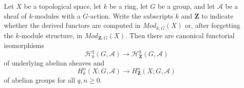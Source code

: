\begin{lemma}
\label{lemma-sheaf-group-cohomology-change-coefficients}
\begin{reference}
\cite[Chapter IV, \S 4.4, Remark 1, pp. 194--195]{Tohoku}
\end{reference}
Let $X$ be a topological space, let $k$ be a ring, let $G$ be a group, and
let $\mathcal{A}$ be a sheaf of $k$-modules with a $G$-action. Write the
subscripts $k$ and $\mathbf{Z}$ to indicate whether the derived functors are
computed in $\textit{Mod}_{k, G}(X)$ or, after forgetting the $k$-module
structure, in $\textit{Mod}_{\mathbf{Z}, G}(X)$. Then there are canonical
functorial isomorphisms
$$
\mathcal{H}^q_k(G, \mathcal{A})
\longrightarrow
\mathcal{H}^q_{\mathbf{Z}}(G, \mathcal{A})
$$
of underlying abelian sheaves and
$$
H^n_k(X; G, \mathcal{A})
\longrightarrow
H^n_{\mathbf{Z}}(X; G, \mathcal{A})
$$
of abelian groups for all $q, n \geq 0$.
\end{lemma}

